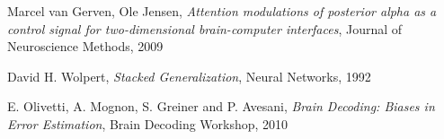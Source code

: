 \documentclass[10pt]{article}
\begin{document}
\begin{thebibliography}{9}

Marcel van Gerven, Ole Jensen,
\emph{Attention modulations of posterior alpha as a control signal for two-dimensional brain-computer interfaces},
Journal of Neuroscience Methods, 2009


David H. Wolpert,
\emph{Stacked Generalization},
Neural Networks, 1992

E. Olivetti, A. Mognon, S. Greiner and P. Avesani, 
\emph{Brain Decoding: Biases in Error Estimation}, 
Brain Decoding Workshop, 2010

\end{thebibliography}
\end{document}
